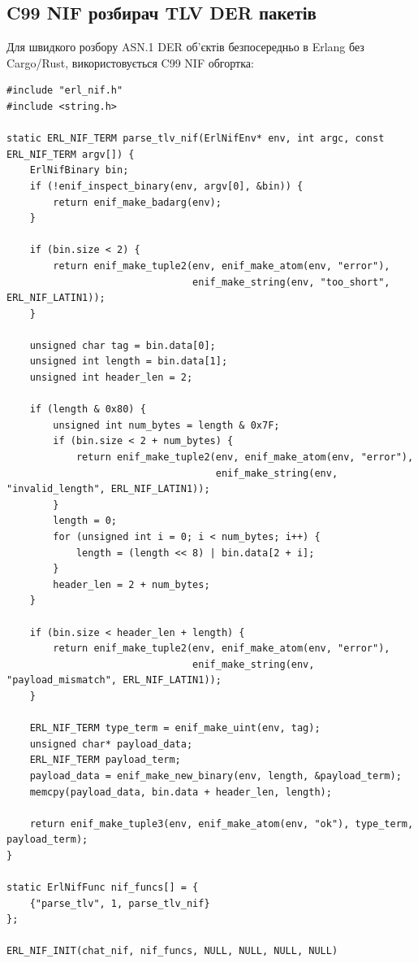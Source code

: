 \subsection{C99 NIF розбирач TLV DER пакетів}
Для швидкого розбору ASN.1 DER об'єктів безпосередньо в Erlang без Cargo/Rust, використовується C99 NIF обгортка:
\begin{lstlisting}
#include "erl_nif.h"
#include <string.h>

static ERL_NIF_TERM parse_tlv_nif(ErlNifEnv* env, int argc, const ERL_NIF_TERM argv[]) {
    ErlNifBinary bin;
    if (!enif_inspect_binary(env, argv[0], &bin)) {
        return enif_make_badarg(env);
    }

    if (bin.size < 2) {
        return enif_make_tuple2(env, enif_make_atom(env, "error"), 
                                enif_make_string(env, "too_short", ERL_NIF_LATIN1));
    }

    unsigned char tag = bin.data[0];
    unsigned int length = bin.data[1];
    unsigned int header_len = 2;

    if (length & 0x80) {
        unsigned int num_bytes = length & 0x7F;
        if (bin.size < 2 + num_bytes) {
            return enif_make_tuple2(env, enif_make_atom(env, "error"), 
                                    enif_make_string(env, "invalid_length", ERL_NIF_LATIN1));
        }
        length = 0;
        for (unsigned int i = 0; i < num_bytes; i++) {
            length = (length << 8) | bin.data[2 + i];
        }
        header_len = 2 + num_bytes;
    }

    if (bin.size < header_len + length) {
        return enif_make_tuple2(env, enif_make_atom(env, "error"), 
                                enif_make_string(env, "payload_mismatch", ERL_NIF_LATIN1));
    }

    ERL_NIF_TERM type_term = enif_make_uint(env, tag);
    unsigned char* payload_data;
    ERL_NIF_TERM payload_term;
    payload_data = enif_make_new_binary(env, length, &payload_term);
    memcpy(payload_data, bin.data + header_len, length);

    return enif_make_tuple3(env, enif_make_atom(env, "ok"), type_term, payload_term);
}

static ErlNifFunc nif_funcs[] = {
    {"parse_tlv", 1, parse_tlv_nif}
};

ERL_NIF_INIT(chat_nif, nif_funcs, NULL, NULL, NULL, NULL)
\end{lstlisting}

